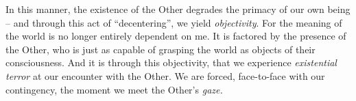 \noindent
In this manner, the existence of the Other degrades the primacy of our own being -- and through this act of \enquote{decentering}, we yield \emph{objectivity}. For the meaning of the world is no longer entirely dependent on me. It is factored by the presence of the Other, who is just as capable of grasping the world as objects of their consciousness. And it is through this objectivity, that we experience \emph{existential terror} at our encounter with the Other. We are forced, face-to-face with our contingency, the moment we meet the Other's \emph{gaze.}